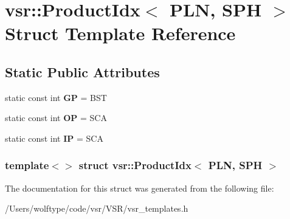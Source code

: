 \hypertarget{structvsr_1_1_product_idx_3_01_p_l_n_00_01_s_p_h_01_4}{\section{vsr\-:\-:Product\-Idx$<$ P\-L\-N, S\-P\-H $>$ Struct Template Reference}
\label{structvsr_1_1_product_idx_3_01_p_l_n_00_01_s_p_h_01_4}
}
\subsection*{Static Public Attributes}
\begin{DoxyCompactItemize}
\item 
\hypertarget{structvsr_1_1_product_idx_3_01_p_l_n_00_01_s_p_h_01_4_af4fe2bd88f60a34646ae0c32c7572950}{static const int {\bfseries G\-P} = B\-S\-T}\label{structvsr_1_1_product_idx_3_01_p_l_n_00_01_s_p_h_01_4_af4fe2bd88f60a34646ae0c32c7572950}

\item 
\hypertarget{structvsr_1_1_product_idx_3_01_p_l_n_00_01_s_p_h_01_4_a6e6c80883b6374a76d53f85163b1b84b}{static const int {\bfseries O\-P} = S\-C\-A}\label{structvsr_1_1_product_idx_3_01_p_l_n_00_01_s_p_h_01_4_a6e6c80883b6374a76d53f85163b1b84b}

\item 
\hypertarget{structvsr_1_1_product_idx_3_01_p_l_n_00_01_s_p_h_01_4_a982b5a048eb95521c976c2cf8b9d5bec}{static const int {\bfseries I\-P} = S\-C\-A}\label{structvsr_1_1_product_idx_3_01_p_l_n_00_01_s_p_h_01_4_a982b5a048eb95521c976c2cf8b9d5bec}

\end{DoxyCompactItemize}
\subsubsection*{template$<$$>$ struct vsr\-::\-Product\-Idx$<$ P\-L\-N, S\-P\-H $>$}



The documentation for this struct was generated from the following file\-:\begin{DoxyCompactItemize}
\item 
/\-Users/wolftype/code/vsr/\-V\-S\-R/vsr\-\_\-templates.\-h\end{DoxyCompactItemize}
